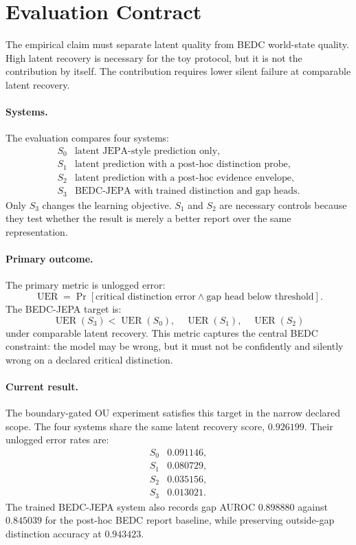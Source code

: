 \section{Evaluation Contract}
\label{sec:evaluation-contract}

The empirical claim must separate latent quality from BEDC world-state
quality.  High latent recovery is necessary for the toy protocol, but it is
not the contribution by itself.  The contribution requires lower silent
failure at comparable latent recovery.

\paragraph{Systems.}
The evaluation compares four systems:
$$
\begin{array}{ll}
S_0 & \text{latent JEPA-style prediction only},\\
S_1 & \text{latent prediction with a post-hoc distinction probe},\\
S_2 & \text{latent prediction with a post-hoc evidence envelope},\\
S_3 & \text{BEDC-JEPA with trained distinction and gap heads}.
\end{array}
$$
Only $S_3$ changes the learning objective.  $S_1$ and $S_2$ are necessary
controls because they test whether the result is merely a better report over
the same representation.

\paragraph{Primary outcome.}
The primary metric is unlogged error:
$$
\operatorname{UER}
=
\Pr[
  \text{critical distinction error}
  \wedge
  \text{gap head below threshold}
].
$$
The BEDC-JEPA target is:
$$
\operatorname{UER}(S_3)
<
\operatorname{UER}(S_0),\quad
\operatorname{UER}(S_1),\quad
\operatorname{UER}(S_2)
$$
under comparable latent recovery.  This metric captures the central BEDC
constraint: the model may be wrong, but it must not be confidently and
silently wrong on a declared critical distinction.

\paragraph{Current result.}
The boundary-gated OU experiment satisfies this target in the narrow declared
scope.  The four systems share the same latent recovery score, $0.926199$.
Their unlogged error rates are:
$$
\begin{array}{ll}
S_0 & 0.091146,\\
S_1 & 0.080729,\\
S_2 & 0.035156,\\
S_3 & 0.013021.
\end{array}
$$
The trained BEDC-JEPA system also records gap AUROC $0.898880$ against
$0.845039$ for the post-hoc BEDC report baseline, while preserving
outside-gap distinction accuracy at $0.943423$.

